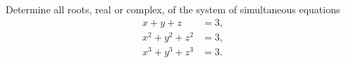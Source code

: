 Determine all roots, real or complex, of the system of simultaneous equations\begin{align*} x+y+z &= 3, \\

x^2+y^2+z^2 &= 3, \\

x^3+y^3+z^3 &= 3.\end{align*}